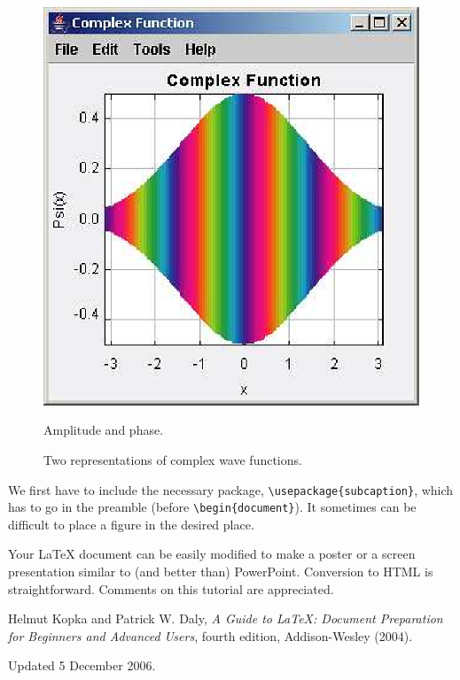 \documentclass[12pt]{article}
\begin{document}
\begin{figure}[!ht]
\begin{subcaptionblock}{.4\textwidth}
\includegraphics[scale=0.5]{figures/phase}
\caption{Amplitude and phase.}
\label{ap}
\end{subcaptionblock}
\caption{Two representations of complex wave functions.}\label{fig:qm/complexfunctions}
\end{figure}

We first have to include the necessary package, \verb+\usepackage{subcaption}+, which has to go in the preamble (before \verb+\begin{document}+). It sometimes can be difficult to place a figure in the desired place.

Your LaTeX document can be easily modified to make a poster or a screen presentation similar to (and better than) PowerPoint. Conversion to HTML is straightforward. Comments on this tutorial are appreciated.

\begin{thebibliography}{5}

Helmut Kopka and Patrick W. Daly, \textsl{A Guide to \LaTeX: Document Preparation for Beginners and Advanced Users}, fourth edition, Addison-Wesley (2004).

\end{thebibliography}

{\small \noindent Updated 5 December 2006.}
\end{document}
